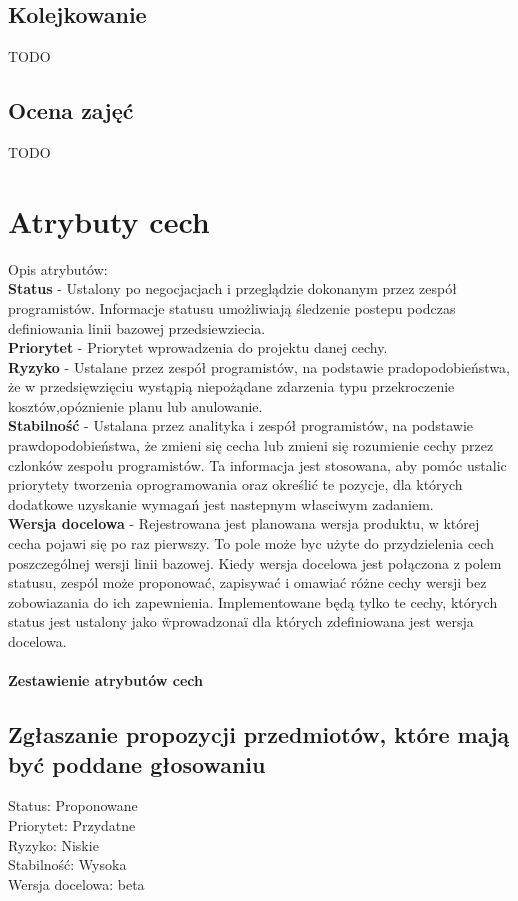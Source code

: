 \documentclass[11pt,leqno]{article}
\begin{document}
\subsection{Kolejkowanie}
TODO

\subsection{Ocena zajęć}
TODO

\section{Atrybuty cech}
Opis atrybutów: \\
\textbf{Status} - Ustalony po negocjacjach i przeglądzie dokonanym przez zespół programistów. Informacje statusu umożliwiają śledzenie postepu podczas definiowania linii bazowej przedsiewziecia.\\
\textbf{Priorytet} - Priorytet wprowadzenia do projektu danej cechy.\\
\textbf{Ryzyko} - Ustalane przez zespół programistów, na podstawie pradopodobieństwa, że w przedsięwzięciu wystąpią niepożądane zdarzenia typu przekroczenie kosztów,opóznienie planu lub anulowanie. \\
\textbf{Stabilność} - Ustalana przez analityka i zespół programistów, na podstawie prawdopodobieństwa, że zmieni się cecha lub zmieni się rozumienie cechy przez czlonków zespołu programistów. Ta informacja jest stosowana, aby pomóc ustalic priorytety tworzenia oprogramowania oraz określić te pozycje, dla których dodatkowe uzyskanie wymagań jest nastepnym własciwym zadaniem. \\
\textbf{Wersja docelowa} - Rejestrowana jest planowana wersja produktu, w której cecha pojawi się po raz pierwszy. To pole może byc użyte do przydzielenia cech poszczególnej wersji linii bazowej. Kiedy wersja docelowa jest połączona z polem statusu, zespól może proponować, zapisywać i omawiać różne cechy wersji bez zobowiazania do ich zapewnienia. Implementowane będą tylko te cechy, których status jest ustalony jako \"wprowadzona\" i dla których zdefiniowana jest wersja docelowa. \\ \\
\textbf{Zestawienie atrybutów cech} 
\subsection{Zgłaszanie propozycji przedmiotów, które mają być poddane głosowaniu}
Status: Proponowane  \\
Priorytet: Przydatne \\
Ryzyko: Niskie \\
Stabilność: Wysoka \\
Wersja docelowa: beta \\
\end{document}
